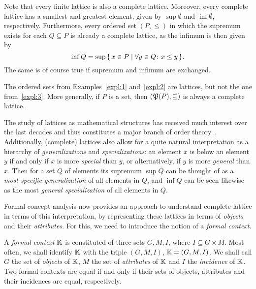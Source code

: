 Note that every finite lattice is also a complete lattice.  Moreover, every complete
lattice has a smallest and greatest element, given by $\sup\emptyset$ and $\inf\emptyset$,
respectively.  Furthermore, every ordered set $(P, \le)$ in which the supremum exists for
each $Q \subseteq P$ is already a complete lattice, as the infimum is then given by
\begin{equation*}
  \inf Q = \sup{\ensuremath{\{\, x \in P \mid \forall y \in Q \colon x \le y \,\}}}.
\end{equation*}
The same is of course true if supremum and infimum are exchanged.

The ordered sets from Examples~\ref{expl:1} and~\ref{expl:2} are lattices, but not the one
from~\ref{expl:3}.  More generally, if $P$ is a set, then $({\mathfrak{P}(P)}, \subseteq)$ is
always a complete lattice.

The study of lattices as mathematical structures has received much interest over the last
decades and thus constitutes a major branch of order
theory~\cite{Gratzer,books/math/Davey02,books/math/Birkhoff67}.  Additionally, (complete)
lattices also allow for a quite natural interpretation as a hierarchy of
\emph{generalizations} and \emph{specializations}: an element $x$ is below an element $y$
if and only if $x$ is more \emph{special} than $y$, or alternatively, if $y$ is more
\emph{general} than $x$.  Then for a set $Q$ of elements its supremum $\sup Q$ can be
thought of as a \emph{most-specific generalization} of all elements in $Q$, and $\inf Q$
can be seen likewise as the most \emph{general specialization} of all elements in $Q$.

Formal concept analysis now provides an approach to understand complete lattice in terms
of this interpretation, by representing these lattices in terms of \emph{objects} and
their \emph{attributes}.  For this, we need to introduce the notion of a \emph{formal
  context}.

\begin{Definition}
  \label{def:formal-context}
  A \emph{formal context} ${\mathbb{K}}$ is constituted of three sets $G, M, I$, where $I
  \subseteq G \times M$.  Most often, we shall identify ${\mathbb{K}}$ with the triple $(G, M,
  I)$, \ie ${\mathbb{K}} = (G, M, I)$.  We shall call $G$ the set of \emph{objects} of ${\mathbb{K}}$,
  $M$ the set of \emph{attributes} of ${\mathbb{K}}$ and $I$ the \emph{incidence} of ${\mathbb{K}}$.
  Two formal contexts are equal if and only if their sets of objects, attributes and their
  incidences are equal, respectively.
\end{Definition}

